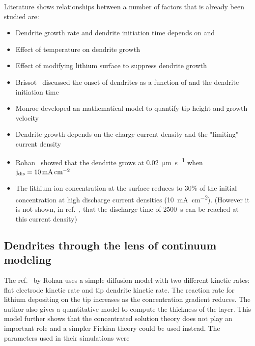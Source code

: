 \documentclass[12pt]{book}
\begin{document}
Literature shows relationships between a number of factors that is already been studied are:
\begin{itemize}
\item Dendrite growth rate and dendrite initiation time depends on   and  \cite{Nishikawa2010}
\item Effect of temperature on dendrite growth \cite{Park2008}
\item Effect of modifying lithium surface to suppress dendrite growth
\item Brissot~\cite{Brissot1999} discussed the onset of dendrites as a function of  and the dendrite initiation time
\item Monroe developed an mathematical model to quantify tip height and growth velocity
\item Dendrite growth depends on the charge current density and the "limiting" current density~\cite{Akolkar2013}
\item Rohan~\cite{Akolkar2013} showed that the dendrite grows at \SI{0.02}{\micro\meter\per\second} when $\ce{j_{dis}} = \SI{10}{\milli\ampere\per\centi\meter\squared}$
\item The lithium ion concentration at the surface reduces to 30\% of the initial concentration at  high discharge current densities (\SI{10}{\milli\ampere\per\centi\meter\squared}). (However it is not shown, in ref.~\cite{Akolkar2013}, that the discharge time of \SI{2500}{\second} can be reached at this current density)
\end{itemize}

\subsection{Dendrites through the lens of continuum modeling}
The ref.~\cite{Akolkar2013} by Rohan uses a simple diffusion model with two different kinetic rates: flat electrode kinetic rate and tip dendrite kinetic rate. The reaction rate for lithium depositing on the tip increases as the concentration gradient reduces. The author also gives a quantitative model to compute the thickness of the layer. This model further shows that the concentrated solution theory does not play an important role and a simpler Fickian theory could be used instead. The parameters used in their simulations were
\end{document}
